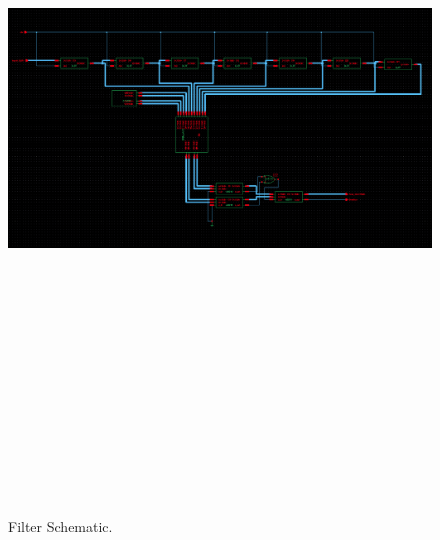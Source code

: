 \begin{figure}[htbp]
\centering
\includegraphics[angle=90,height=8in]{images/Filter-Schematic}
\caption{Filter Schematic.}
\label{fig:filterschematic}
\end{figure}


